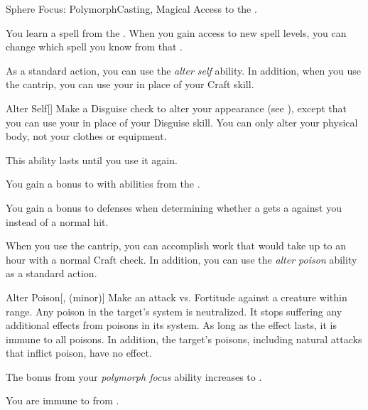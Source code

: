     \begin{feat}{Sphere Focus: Polymorph}{Casting, Magical}
        \featpre Access to the  .

         You learn a spell from the  .
        When you gain access to new spell levels, you can change which spell you know from that .

         As a standard action, you can use the \textit{alter self} ability.
        In addition, when you use the  cantrip, you can use your  in place of your Craft skill.
        \begin{freeability}{Alter Self}[]
            Make a Disguise check to alter your appearance (see ), except that you can use your  in place of your Disguise skill.
            You can only alter your physical body, not your clothes or equipment.

            This ability lasts until you use it again.
        \end{freeability}

         You gain a  bonus to  with abilities from the  .

         You gain a  bonus to defenses when determining whether a  gets a  against you instead of a normal hit.

         When you use the  cantrip, you can accomplish work that would take up to an hour with a normal Craft check.
        In addition, you can use the \textit{alter poison} ability as a standard action.
        \begin{freeability}{Alter Poison}[,  (minor)]
            Make an attack vs. Fortitude against a creature within \rngclose range.
            \hit Any poison in the target's system is neutralized.
            It stops suffering any additional effects from poisons in its system.
            As long as the effect lasts, it is immune to all poisons.
            In addition, the target's  poisons, including natural attacks that inflict poison, have no effect.
        \end{freeability}

         The bonus from your \textit{polymorph focus} ability increases to .

         You are immune to  from .
    \end{feat}

